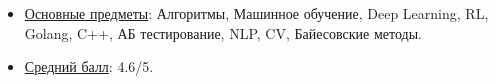 \begin{itemize}
    \item \underline{Основные предметы}: Алгоритмы, Машинное обучение, Deep Learning, RL, Golang, C++, АБ тестирование, NLP, CV, Байесовские методы.
    \item \underline{Средний балл}: 4.6/5.
\end{itemize}

